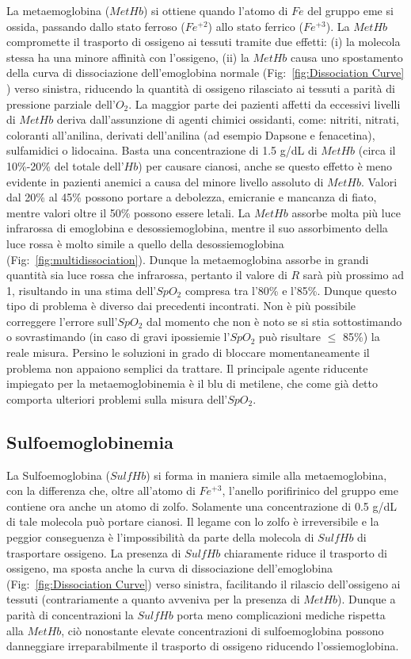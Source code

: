 \documentclass[a4paper, 12pt]{book}
\begin{document}
La metaemoglobina ($MetHb$) si ottiene quando l'atomo di $Fe$ del gruppo eme si ossida, passando dallo stato ferroso ($Fe^{+2}$) allo stato ferrico ($Fe^{+3}$).
La $MetHb$ compromette il trasporto di ossigeno ai tessuti tramite due effetti: (i) la molecola stessa ha una minore affinità con l'ossigeno, (ii) la $MetHb$ causa uno spostamento della curva di dissociazione dell'emoglobina normale (Fig:~\ref{fig:Dissociation Curve} ) verso sinistra, riducendo la quantità di ossigeno rilasciato ai tessuti a parità di pressione parziale dell'$O_2$.
La maggior parte dei pazienti affetti da eccessivi livelli di $MetHb$ deriva dall'assunzione di agenti chimici ossidanti, come: nitriti, nitrati, coloranti all'anilina, derivati dell'anilina (ad esempio Dapsone e fenacetina), sulfamidici o lidocaina.
Basta una concentrazione di 1.5 g/dL di $MetHb$ (circa il 10\%-20\% del totale dell'$Hb$) per causare cianosi, anche se questo effetto è meno evidente in pazienti anemici a causa del minore livello assoluto di $MetHb$.
Valori dal 20\% al 45\% possono portare a debolezza, emicranie e mancanza di fiato, mentre valori oltre il 50\% possono essere letali.
La $MetHb$ assorbe molta più luce infrarossa di emoglobina e desossiemoglobina, mentre il suo assorbimento della luce rossa è molto simile a quello della desossiemoglobina (Fig:~\ref{fig:multidissociation}).
Dunque la metaemoglobina assorbe in grandi quantità sia luce rossa che infrarossa, pertanto il valore di $R$ sarà più prossimo ad 1, risultando in una stima dell'$SpO_2$ compresa tra l'80\% e l'85\%.
Dunque questo tipo di problema è diverso dai precedenti incontrati.
Non è più possibile correggere l'errore sull'$SpO_2$  dal momento che non è noto se si stia sottostimando o sovrastimando (in caso di gravi ipossiemie l'$SpO_2$ può risultare $\leq$ 85\%) la reale misura.
Persino le soluzioni in grado di bloccare momentaneamente il problema non appaiono semplici da trattare.
Il principale agente riducente impiegato per la metaemoglobinemia è il blu di metilene, che come già detto comporta ulteriori problemi sulla misura dell'$SpO_2$.


\subsection{Sulfoemoglobinemia}

La Sulfoemoglobina ($SulfHb$) si forma in maniera simile alla metaemoglobina, con la differenza che, oltre all'atomo di $Fe^{+3}$, l'anello porifirinico del gruppo eme contiene ora anche un atomo di zolfo.
Solamente una concentrazione di 0.5 g/dL di tale molecola può portare cianosi.
Il legame con lo zolfo è irreversibile e la peggior conseguenza è l'impossibilità da parte della molecola di $SulfHb$ di trasportare ossigeno.
La presenza di $SulfHb$ chiaramente riduce il trasporto di ossigeno, ma sposta anche la curva di dissociazione dell'emoglobina (Fig:~\ref{fig:Dissociation Curve}) verso sinistra, facilitando il rilascio dell'ossigeno ai tessuti (contrariamente a quanto avveniva per la presenza di $MetHb$).
Dunque a parità di concentrazioni la $SulfHb$ porta meno complicazioni mediche rispetta alla $MetHb$, ciò nonostante elevate concentrazioni di sulfoemoglobina possono danneggiare irreparabilmente il trasporto di ossigeno riducendo l'ossiemoglobina.
\end{document}
